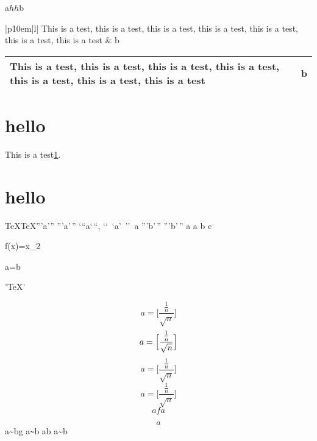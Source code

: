 \documentclass{article}
\begin{document}
\thispagestyle{empty}
a$hh$b
\begin{table}[ht]
	\begin{tabular}{|p{10em}|l|}\hline
		This is a test, this is a test, this is a test, this is a test, this is a test, this is a test, this is a test & b\\ \hline
	\end{tabular}
	\newline
	\begin{tabularx}{\linewidth}{|X|l|}\hline
		This is a test, this is a test, this is a test, this is a test, this is a test, this is a test, this is a test & b\\ \hline
	\end{tabularx}
\end{table}
\section{hello}\label{sec:test}
This is a test\ref{sec:test}.
\newpage
\section{hello}
\csname\string\TeX\endcsname \csname TeX\endcsname '''a'\thinspace'' '''a'\,'' {`}``a`\,``, \lq\lq\ \lq a\rq\ \rq\rq\ a
'''b'$\,$'' '''b'\,'' a a b c

\begin{halfequ}
f(x)=x_{2}
\end{halfequ}
\begin{halfequ}
a=b
\end{halfequ}

\'{}\TeX\'{}

\begin{equation}
a=\bigl[\frac{\frac{1}{n}}{\sqrt{n}}\bigr]
\end{equation}
\begin{equation}
	a=\Bigl[\frac{\frac{1}{n}}{\sqrt{n}}\Bigr]
\end{equation}
\begin{equation}
	a=\biggl[\frac{\frac{1}{n}}{\sqrt{n}}\biggr]
\end{equation}
\begin{equation}
	a=\Biggl[\frac{\frac{1}{n}}{\sqrt{n}}\Biggr]
\end{equation}
\begin{equation}
afa
\end{equation}

\begin{equation}
a
\end{equation}
a\~{\space}bg a\verb*|~|b a\texttildelow b a\textasciitilde b
\end{document}
